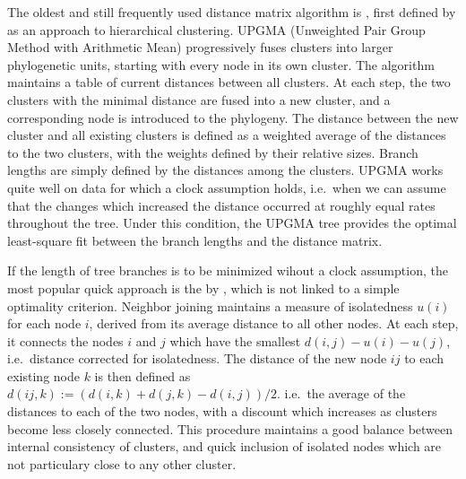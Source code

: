 The oldest and still frequently used distance matrix algorithm is , first defined by \citet{sokal_michener_1958} as an approach to hierarchical clustering. UPGMA (Unweighted Pair Group Method with Arithmetic Mean) progressively fuses clusters into larger phylogenetic units, starting with every node in its own cluster. The algorithm maintains a table of current distances between all clusters. At each step, the two clusters with the minimal distance are fused into a new cluster, and a corresponding node is introduced to the phylogeny. The distance between the new cluster and all existing clusters is defined as a weighted average of the distances to the two clusters, with the weights defined by their relative sizes. Branch lengths are simply defined by the distances among the clusters. UPGMA works quite well on data for which a clock assumption holds, i.e.\ when we can assume that the changes which increased the distance occurred at roughly equal rates throughout the tree. Under this condition, the 
UPGMA tree provides the optimal least-square fit between the branch lengths and the distance matrix.

If the length of tree branches is to be minimized wihout a clock assumption, the most popular quick approach is the  by \citet{saitou_nei_1987}, which is not linked to a simple optimality criterion. Neighbor joining maintains a measure of isolatedness $u(i)$ for each node $i$, derived from its average distance to all other nodes. At each step, it connects the nodes $i$ and $j$ which have the smallest $d(i,j) - u(i) - u(j)$, i.e.\ distance corrected for isolatedness. The distance of the new node $ij$ to each existing node $k$ is then defined as $d(ij,k) := (d(i,k) + d(j,k) - d(i,j))/2$. i.e.\ the average of the distances to each of the two nodes, with a discount which increases as clusters become less closely connected. This procedure maintains a good balance between internal consistency of clusters, and quick inclusion of isolated nodes which are not particulary close to any other cluster.

